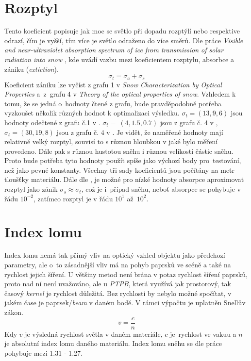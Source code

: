 \section{Rozptyl}\label{rozptyl}
Tento koeficient popisuje jak moc se světlo při dopadu rozptýlí nebo respektive odrazí, čím je vyšší, tím více je světlo odraženo do více směrů. Dle práce \textit{Visible and near-ultraviolet absorption spectrum of ice from transmission of solar radiation into snow} \cite{snow_extiction_scattering}, kde uvádí vazbu mezi koeficientem rozptylu, absorbce a zániku (\textit{extiction}). $$ \sigma_t = \sigma_a + \sigma_s$$  Koeficient zániku lze vyčíst z grafu 1 v \textit{Snow Characterization by Optical Properties}\cite{extin1} a~z~grafu 4 v \textit{Theory of the optical properties of snow}\cite{extin2}. Vzhledem k tomu, že se jedná o~hodnoty čtené z grafu, bude pravděpodobně potřeba vyzkoušet několik různých hodnot k optimalizaci výsledku. $\sigma_t = (13, 9, 6)$ jsou hodnoty odečtené z grafu č.1 v \cite{extin1}. $\sigma_t =~(4, 1.5, 0.7)$ jsou z grafu č. 4 v \cite{extin2}, $\sigma_t = (30, 19, 8)$ jsou z grafu č. 4 v \cite{snow_extiction_scattering}. Je vidět, že naměřené hodnoty mají relativně velký rozptyl, souvisí to s různou hloubkou v jaké bylo  měření provedeno. Dále pak s různou hustotou sněhu i různou velikostí částic sněhu. Proto bude potřeba tyto hodnoty použít spíše jako výchozí body pro~testování, než jako pevné konstanty. Všechny tři sady koeficientů jsou počítány na metr tloušťky materiálu. Dále dle \cite{soos}, je možné pro nízké hodnoty absorpce aproximovat rozptyl jako zánik $\sigma_s \approx \sigma_t$, což je i~případ sněhu, neboť absorpce se pohybuje v řádu $10^{-2}$, zatímco rozptyl je v řádu $10^{1}$ až~$10^{2}$.
\section{Index lomu}
Index lomu nemá tak přímý vliv na optický vzhled objektu jako předchozí parametry, ale o~to zásadnější vliv má na pohyb paprsků ve scéně a také na rychlost jejich šíření. U většiny metod není brána v potaz rychlost šíření paprsků, proto nad ní není uvažováno, ale u \textit{PTPB}, která využívá jak prostorový, tak časový \textit{kernel} je rychlost důležitá. Bez rychlosti by nebylo možné spočítat, v jakém čase je paprsek/\textit{beam} v daném bodě. V rámci výpočtu je uplatněn Snellův zákon. $$v = \frac{c}{n}$$ 
\newpage
Kdy $v$ je výsledná rychlost světla v daném materiále, $c$ je~rychlost ve vakuu a $n$ je absolutní index lomu daného materiálu.
Index lomu sněhu se dle práce \cite{soos} pohybuje mezi 1.31 - 1.27.
